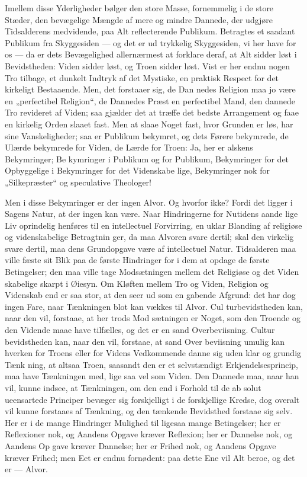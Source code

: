 \documentclass[12pt]{book}
\newcommand{\opage}[1]{\marginnote{\footnotesize\textit{[#1]}}}
\begin{document}
Imellem disse Yderligheder bølger den store Masse,
fornemmelig i de store Stæder, den bevægelige Mængde
af mere og mindre Dannede, der udgjøre Tidsalderens
medvidende, paa Alt reflecterende Publikum. Betragtes
et saadant Publikum fra Skyggesiden --- og det er ud\-%
trykkelig Skyggesiden, vi her have for os --- da er dets
Bevægelighed allernærmest at forklare deraf, at Alt
sidder løst i Bevidstheden: Viden sidder løst, og Troen
sidder løst. Vist er her endnu nogen Tro tilbage, et
dunkelt Indtryk af det Mystiske, en praktisk Respect for
det kirkeligt Bestaaende. Men, det forstaaer sig, de Dan\-%
nedes Religion maa jo være en „perfectibel Religion“, de
Dannedes Præst en perfectibel Mand, den dannede Tro
revideret af Viden; saa gjælder det at træffe det bedste
Arrangement og faae en kirkelig Orden slaaet fast.
Men at slaae Noget fast, hvor Grunden er løs, har sine
Vanskeligheder; saa er Publikum bekymret, og dets
Førere bekymrede, de Ulærde bekymrede for Viden, de
Lærde for Troen: Ja, her er alskens Bekymringer; Be\-%
kymringer i Publikum og for Publikum, Bekymringer
for det Opbyggelige i Bekymringer for det Videnskabe\-%
lige, Bekymringer nok for „Silkepræster“ og speculative
Theologer!

Men i disse Bekymringer er der ingen Alvor. Og
hvorfor ikke? Fordi det ligger i Sagens Natur, at der
\opage{72}\setcounter{footnote}{0}%
ingen kan være. Naar Hindringerne for Nutidens aande\-%
lige Liv oprindelig henføres til en intellectuel Forvirring,
en uklar Blanding af religiøse og videnskabelige Betragtnin\-%
ger, da maa Alvoren svare dertil; skal den virkelig svare
dertil, maa dens Grundopgave være af intellectuel Natur.
Tidsalderen maa ville fæste sit Blik paa de første Hindringer
for i dem at opdage de første Betingelser; den maa ville
tage Modsætningen mellem det Religiøse og det Viden\-%
skabelige skarpt i Øiesyn. Om Kløften mellem Tro og
Viden, Religion og Videnskab end er saa stor, at den
seer ud som en gabende Afgrund: det har dog ingen
Fare, naar Tænkningen blot kan vækkes til Alvor. Cul\-%
turbevidstheden kan, naar den vil, forstaae, at her trods Mod\-%
sætningen er Noget, som den Troende og den Vidende maae
have tilfælles, og det er en sand Overbeviisning. Cultur\-%
bevidstheden kan, naar den vil, forstaae, at sand Over\-%
beviisning umulig kan hverken for Troens eller for Videns
Vedkommende danne sig uden klar og grundig Tænk\-%
ning, at altsaa Troen, saasandt den er et selvstændigt
Erkjendelsesprincip, maa have Tænkningen med, lige saa
vel som Viden. Den Dannede maa, naar han vil, kunne
indsee, at Tænkningen, om den end i Forhold til de ab\-%
solut ueensartede Principer bevæger sig forskjelligt i de
forskjellige Kredse, dog overalt vil kunne forstaaes af
Tænkning, og den tænkende Bevidsthed forstaae sig selv.
Her er i de mange Hindringer Mulighed til ligesaa mange
Betingelser; her er Reflexioner nok, og Aandens Opgave
kræver Reflexion; her er Dannelse nok, og Aandens Op\-%
gave kræver Dannelse; her er Frihed nok, og Aandens
Opgave kræver Frihed; men Eet er endnu fornødent:
paa dette Ene vil Alt beroe, og det er --- Alvor.
\end{document}
